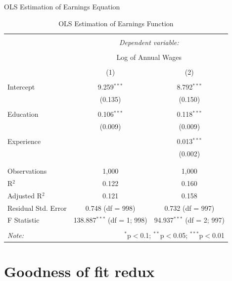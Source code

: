 \documentclass[
]{book}
\theoremstyle{definition}
\theoremstyle{definition}
\theoremstyle{definition}
\theoremstyle{definition}
\theoremstyle{remark}
\begin{document}
\label{tab:ch4table1} OLS Estimation of Earnings Equation

\begin{table}[!htbp] \centering 
  \caption{OLS Estimation of Earnings Function} 
  \label{} 
\begin{tabular}{@{\extracolsep{5pt}}lcc} 
\\[-1.8ex]\hline 
\hline \\[-1.8ex] 
 & \multicolumn{2}{c}{\textit{Dependent variable:}} \\ 
\cline{2-3} 
\\[-1.8ex] & \multicolumn{2}{c}{Log of Annual Wages} \\ 
\\[-1.8ex] & (1) & (2)\\ 
\hline \\[-1.8ex] 
 Intercept & 9.259$^{***}$ & 8.792$^{***}$ \\ 
  & (0.135) & (0.150) \\ 
  & & \\ 
 Education & 0.106$^{***}$ & 0.118$^{***}$ \\ 
  & (0.009) & (0.009) \\ 
  & & \\ 
 Experience &  & 0.013$^{***}$ \\ 
  &  & (0.002) \\ 
  & & \\ 
\hline \\[-1.8ex] 
Observations & 1,000 & 1,000 \\ 
R$^{2}$ & 0.122 & 0.160 \\ 
Adjusted R$^{2}$ & 0.121 & 0.158 \\ 
Residual Std. Error & 0.748 (df = 998) & 0.732 (df = 997) \\ 
F Statistic & 138.887$^{***}$ (df = 1; 998) & 94.937$^{***}$ (df = 2; 997) \\ 
\hline 
\hline \\[-1.8ex] 
\textit{Note:}  & \multicolumn{2}{r}{$^{*}$p$<$0.1; $^{**}$p$<$0.05; $^{***}$p$<$0.01} \\ 
\end{tabular} 
\end{table}

\hypertarget{goodness-of-fit-redux}{%
\section{Goodness of fit redux}\label{goodness-of-fit-redux}}
\end{document}
